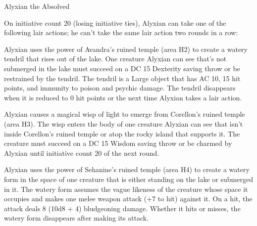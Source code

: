 \documentclass[10pt,a4paper,twoside,twocolumn,openany,nodeprecatedcode]{dndbook}
\begin{document}
\begin{DndMonster}[float=ht]{Alyxian the Absolved}
\begin{DndMonsterLegendaryActions}
\end{DndMonsterLegendaryActions}
\par {}
On initiative count 20 (losing initiative ties), Alyxian can take one of the following lair actions; he can't take the same lair action two rounds in a row:


\begin{description}[nolistsep]
\item[Avandra's Grasp]
Alyxian uses the power of Avandra's ruined temple (area H2) to create a watery tendril that rises out of the lake. One creature Alyxian can see that's not submerged in the lake must succeed on a DC 15 Dexterity saving throw or be restrained by the tendril. The tendril is a Large object that has AC 10, 15 hit points, and immunity to poison and psychic damage. The tendril disappears when it is reduced to 0 hit points or the next time Alyxian takes a lair action.

\item[Corellon's Charm]
Alyxian causes a magical wisp of light to emerge from Corellon's ruined temple (area H3). The wisp enters the body of one creature Alyxian can see that isn't inside Corellon's ruined temple or atop the rocky island that supports it. The creature must succeed on a DC 15 Wisdom saving throw or be charmed by Alyxian until initiative count 20 of the next round.

\item[Sehanine's Torment]
Alyxian uses the power of Sehanine's ruined temple (area H4) to create a watery form in the space of one creature that is either standing on the lake or submerged in it. The watery form assumes the vague likeness of the creature whose space it occupies and makes one melee weapon attack (+7 to hit) against it. On a hit, the attack deals 8 (10d8 + 4) bludgeoning damage. Whether it hits or misses, the watery form disappears after making its attack.

\end{description}


\end{DndMonster}
\end{document}
